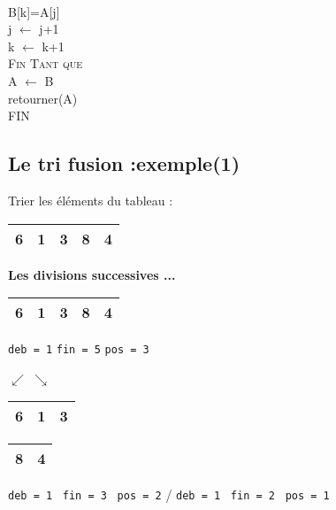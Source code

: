 \documentclass[a4paper,french]{article}
\begin{document}
{{{\\
\hspace*{15mm} B[k]=A[j]
\\
\hspace*{15mm} j $\longleftarrow$ j+1
\\
\hspace*{15mm} k $\longleftarrow$ k+1
\\
\hspace*{10mm} \textsc{Fin Tant que}
\\ 
\hspace*{10mm} A $\longleftarrow$ B
\\
\hspace*{10mm} retourner(A)
\\
\hspace*{5mm} FIN
}}
\vspace*{5mm}
\pagebreak

\subsection{Le tri fusion :exemple(1)}

Trier les éléments du tableau :
\setlength{\extrarowheight}{1mm}
\begin{tabular}{|c|c|c|c|c|}
\hline 
6 & 1 & 3 & 8 & 4 \\ 
\hline 
\end{tabular} 
\bigskip

\textbf{Les divisions successives ...}
\bigskip

\setlength{\extrarowheight}{1mm}
\hspace*{12mm}
\begin{tabular}{|ccccc|}
\hline 
6 & 1 & 3 & 8 & 4 \\ 
\hline 
\end{tabular}  
\hspace*{15mm} \texttt{deb = 1} \quad \texttt{fin = 5} \quad \texttt{pos = 3}
\medskip

\hspace*{18mm} $\swarrow$ \qquad $\searrow$
\medskip

\hspace*{5mm}
\begin{tabular}{|ccc|}
\hline 
6 & 1 & 3  \\ 
\hline 
\end{tabular}
\qquad
\begin{tabular}{|cc|}
\hline 
8 & 4  \\ 
\hline 
\end{tabular}
\hspace*{8mm} \texttt{deb = 1} \  \texttt{fin = 3} \ \texttt{pos = 2} / \texttt{deb = 1} \  \texttt{fin = 2} \  \texttt{pos = 1}
\medskip

}
\end{document}
